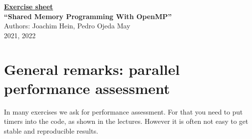 \documentclass[a4paper,oneside,12pt]{article}
\begin{document}
\thispagestyle{empty}

\begin{center}
  \underline{\large \bf Exercise sheet}\\\vspace{0.7cm}
  {\Large \bf ``Shared Memory Programming With OpenMP''}\\[2ex]
  {\Large Authors: Joachim Hein, Pedro Ojeda May\\[2ex]  2021, 2022}
  \vspace{0.5cm}
\end{center}

\section*{General remarks: parallel performance assessment}

In many exercises we ask for performance assessment.  For that you need to put timers into the code, as shown in the lectures.  However it is often not easy to get stable and reproducible results.
\end{document}
